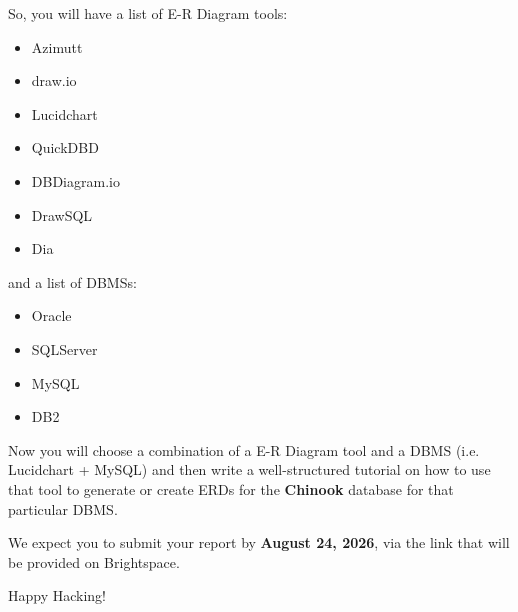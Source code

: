 \documentclass{article}
\begin{document}
So, you will have a list of E-R Diagram tools:

\begin{itemize}
    \item Azimutt
    \item draw.io
    \item Lucidchart
    \item QuickDBD
    \item DBDiagram.io
    \item DrawSQL
    \item Dia
\end{itemize}

and a list of DBMSs:

\begin{itemize}
    \item Oracle
    \item SQLServer
    \item MySQL
    \item DB2
\end{itemize}

Now you will choose a combination of a E-R Diagram tool and a DBMS (i.e. Lucidchart + MySQL) and then write a well-structured tutorial on how to use that tool to generate or create ERDs for the \textbf{Chinook} database for that particular DBMS.

We expect you to submit your report by \textbf{August 24, 2026}, via the link that will be provided on Brightspace\texttrademark.

\vspace{5mm}
Happy Hacking! 
\end{document}

